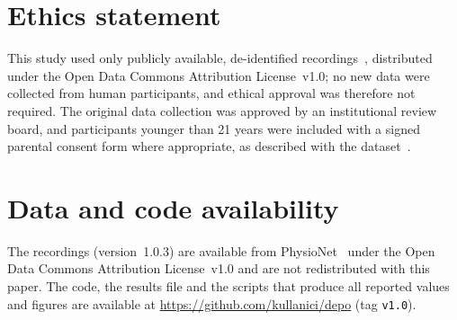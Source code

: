 \documentclass[preprint,12pt]{elsarticle}   %
\begin{document}
\section*{Ethics statement}
This study used only publicly available, de-identified recordings~\cite{Oliveira2022data},
distributed under the Open Data Commons Attribution License~v1.0; no new data were collected
from human participants, and ethical approval was therefore not required. The original data collection
was approved by an institutional review board, and participants younger than 21 years were included with a signed
parental consent form where appropriate, as described with the dataset~\cite{Oliveira2022data}.

\section*{Data and code availability}
The recordings (version~1.0.3) are available from PhysioNet~\cite{Oliveira2022data,Pollard2026}
under the Open Data Commons Attribution License~v1.0 and are not redistributed with this paper.
The code, the results file and the scripts that produce all reported values and figures are
available at \url{https://github.com/kullanici/depo} (tag \texttt{v1.0}).
\end{document}
